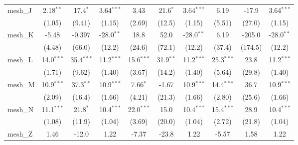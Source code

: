 \begin{tabular}{lccccccccc}
   mesh\_J                                                     & 2.18$^{**}$   & 17.4$^{*}$     & 3.64$^{***}$  & 3.43          & 21.6$^{*}$     & 3.64$^{***}$  & 6.19          & -17.9          & 3.64$^{***}$\\   
                                                               & (1.05)        & (9.41)         & (1.15)        & (2.69)        & (12.5)         & (1.15)        & (5.51)        & (27.0)         & (1.15)\\   
   mesh\_K                                                     & -5.48         & -0.397         & -28.0$^{**}$  & 18.8          & 52.0           & -28.0$^{**}$  & 6.19          & -205.0         & -28.0$^{**}$\\   
                                                               & (4.48)        & (66.0)         & (12.2)        & (24.6)        & (72.1)         & (12.2)        & (37.4)        & (174.5)        & (12.2)\\   
   mesh\_L                                                     & 14.0$^{***}$  & 35.4$^{***}$   & 11.2$^{***}$  & 15.6$^{***}$  & 31.9$^{**}$    & 11.2$^{***}$  & 25.3$^{***}$  & 23.8           & 11.2$^{***}$\\   
                                                               & (1.71)        & (9.62)         & (1.40)        & (3.67)        & (14.2)         & (1.40)        & (5.64)        & (29.8)         & (1.40)\\   
   mesh\_M                                                     & 10.9$^{***}$  & 37.3$^{**}$    & 10.9$^{***}$  & 7.66$^{*}$    & -1.67          & 10.9$^{***}$  & 14.4$^{***}$  & 36.7           & 10.9$^{***}$\\   
                                                               & (2.09)        & (16.4)         & (1.66)        & (4.21)        & (21.3)         & (1.66)        & (2.80)        & (25.6)         & (1.66)\\   
   mesh\_N                                                     & 11.1$^{***}$  & 21.8$^{*}$     & 10.4$^{***}$  & 22.0$^{***}$  & 15.0           & 10.4$^{***}$  & 15.4$^{***}$  & 28.9           & 10.4$^{***}$\\   
                                                               & (1.08)        & (11.9)         & (1.04)        & (3.69)        & (20.0)         & (1.04)        & (2.72)        & (21.8)         & (1.04)\\   
   mesh\_Z                                                     & 1.46          & -12.0          & 1.22          & -7.37         & -23.8          & 1.22          & -5.57         & 1.58           & 1.22\\   

\end{tabular}
